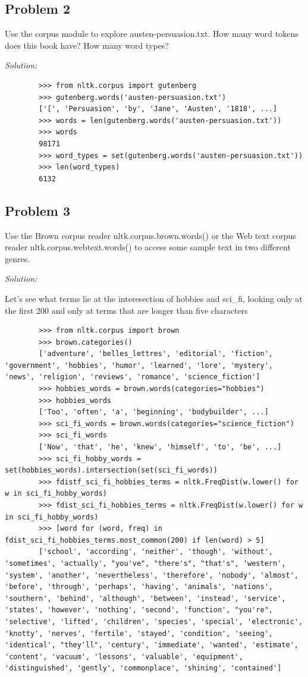 \documentclass[11pt]{article}
\newenvironment{solution}{
	\vspace{10px}\noindent\emph{Solution:}
}{
	\vspace{10px}
}
\begin{document}
\subsection*{Problem 2}
Use the corpus module to explore austen-persuasion.txt. How many word tokens does this book have? How many word types?

\begin{solution}
	\begin{lstlisting}
		>>> from nltk.corpus import gutenberg
		>>> gutenberg.words('austen-persuasion.txt')
		['[', 'Persuasion', 'by', 'Jane', 'Austen', '1818', ...]
		>>> words = len(gutenberg.words('austen-persuasion.txt'))
		>>> words
		98171
		>>> word_types = set(gutenberg.words('austen-persuasion.txt'))
		>>> len(word_types)
		6132
	\end{lstlisting}
\end{solution}  


\subsection*{Problem 3}
Use the Brown corpus reader nltk.corpus.brown.words() or the Web text corpus reader nltk.corpus.webtext.words() to access some sample text in two different genres.

\begin{solution}
	Let's see what terms lie at the interesection of hobbies and sci\_fi, looking only at the first 200 and only at terms that are longer than five characters
	\begin{lstlisting}
		>>> from nltk.corpus import brown
		>>> brown.categories()
		['adventure', 'belles_lettres', 'editorial', 'fiction', 'government', 'hobbies', 'humor', 'learned', 'lore', 'mystery', 'news', 'religion', 'reviews', 'romance', 'science_fiction']
		>>> hobbies_words = brown.words(categories="hobbies")
		>>> hobbies_words
		['Too', 'often', 'a', 'beginning', 'bodybuilder', ...]
		>>> sci_fi_words = brown.words(categories="science_fiction")
		>>> sci_fi_words
		['Now', 'that', 'he', 'knew', 'himself', 'to', 'be', ...]
		>>> sci_fi_hobby_words = set(hobbies_words).intersection(set(sci_fi_words))
		>>> fdistf_sci_fi_hobbies_terms = nltk.FreqDist(w.lower() for w in sci_fi_hobby_words)
		>>> fdist_sci_fi_hobbies_terms = nltk.FreqDist(w.lower() for w in sci_fi_hobby_words)
		>>> [word for (word, freq) in fdist_sci_fi_hobbies_terms.most_common(200) if len(word) > 5]
		['school', 'according', 'neither', 'though', 'without', 'sometimes', 'actually', "you've", "there's", "that's", 'western', 'system', 'another', 'nevertheless', 'therefore', 'nobody', 'almost', 'before', 'through', 'perhaps', 'having', 'animals', 'nations', 'southern', 'behind', 'although', 'between', 'instead', 'service', 'states', 'however', 'nothing', 'second', 'function', "you're", 'selective', 'lifted', 'children', 'species', 'special', 'electronic', 'knotty', 'nerves', 'fertile', 'stayed', 'condition', 'seeing', 'identical', "they'll", 'century', 'immediate', 'wanted', 'estimate', 'content', 'vacuum', 'lessons', 'valuable', 'equipment', 'distinguished', 'gently', 'commonplace', 'shining', 'contained']
	\end{lstlisting}
\end{solution}  
\end{document}
